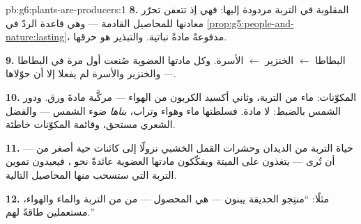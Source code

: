 \begin{solution}{pb:g6:plants-are-producers:1}
\textbf{8.}  المقلوبة في التربة  مردودة إليها:
فهي إذ تتعفن تحرّر معادنها للمحاصيل القادمة --- وهي قاعدة الردّ في
\cref{prop:g5:people-and-nature:lasting}، مدفوعةً مادةً نباتية.
والتبذير هو حرقها.

\textbf{9.}  البطاطا $\leftarrow$ الخنزير $\leftarrow$
الأسرة. وكل مادتها العضوية صُنعت أول مرة في   البطاطا ---
والخنزير والأسرة لم يفعلا إلا أن حوّلاها.

\textbf{10.} المكوّنات: ماء  من التربة، وثاني أكسيد
الكربون من الهواء --- مركَّبة مادةَ ورق. ودور الشمس بالضبط: 
لا مادة. فسلطتها ماء وهواء وتراب، \emph{بناها} ضوء الشمس ---
والفضل الشعري مستحق، وقائمة المكوّنات خاطئة.

\textbf{11.}  --- حياة التربة من الديدان وحشرات القمل
الخشبي نزولًا إلى كائنات حية أصغر من أن تُرى --- يتغذون على
 الميتة ويفكّكون مادتها العضوية عائدةً نحو ،
فيعيدون تموين التربة التي ستسحب منها المحاصيل التالية.

\textbf{12.} مثلًا: ``منتِجو الحديقة يبنون  --- هي
المحصول --- من  من التربة والماء والهواء، مستعملين
 طاقةً لهم.''
\end{solution}
